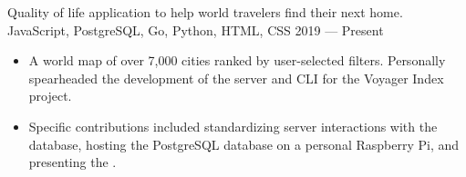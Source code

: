 \showoff
{}
{Quality of life application to help world travelers find their next home.}
{JavaScript, PostgreSQL, Go, Python, HTML, CSS}
{2019 --- Present}

\begin{itemize}[label=$\triangleright$]
    \item A world map of over 7,000 cities ranked by user-selected filters. Personally spearheaded the development of the server and CLI for the Voyager Index project.
    \item Specific contributions included standardizing server interactions with the database, hosting the PostgreSQL database on a personal Raspberry Pi, and presenting the .
\end{itemize}
